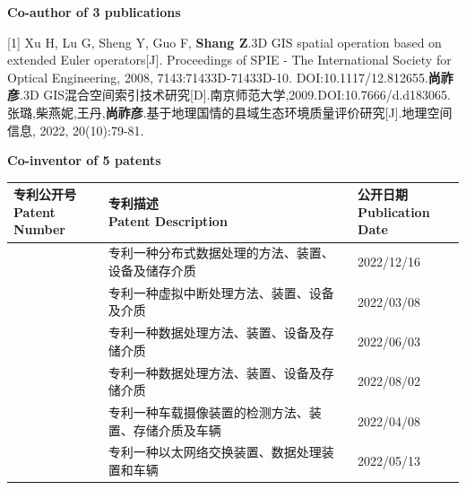 \documentclass{resume}
\begin{document}
\textbf{Co-author of 3 publications}

[1] Xu H, Lu G, Sheng Y, Guo F, \textbf{Shang Z}.3D GIS spatial operation based on extended Euler operators[J].\newline
  Proceedings of SPIE - The International Society for Optical Engineering, 2008, 7143:71433D-71433D-10.\newline
  DOI:10.1117/12.812655.\newline
[2]\textbf{尚祚彦}.3D GIS混合空间索引技术研究[D].南京师范大学,2009.DOI:10.7666/d.d183065.\newline
[3]张璐,柴燕妮,王丹,\textbf{尚祚彦}.基于地理国情的县域生态环境质量评价研究[J].地理空间信息, 2022, 20(10):79-81.

\textbf{Co-inventor of 5 patents}

\begin{tabularx}{\textwidth}{|p{7.2em}|X|p{6.8em}|}
\hline
\makecell[lt]{专利公开号\\Patent Number} & \makecell[lt]{专利描述\\Patent Description} & \makecell[lt]{公开日期\\Publication Date}\\
\hline
[CN115480934A] & 专利一种分布式数据处理的方法、装置、设备及储存介质 & 2022/12/16\\
\hline
[CN114153560A] & 专利一种虚拟中断处理方法、装置、设备及介质 & 2022/03/08\\
\hline
[CN114579556A] & 专利一种数据处理方法、装置、设备及存储介质 & 2022/06/03\\
\hline
[CN114579556B] & 专利一种数据处理方法、装置、设备及存储介质 & 2022/08/02\\
\hline
[CN114298990A] & 专利一种车载摄像装置的检测方法、装置、存储介质及车辆 & 2022/04/08\\
\hline
[CN114500408A] & 专利一种以太网络交换装置、数据处理装置和车辆 & 2022/05/13\\
\hline
\end{tabularx}




  
  


%
%
\end{document}
